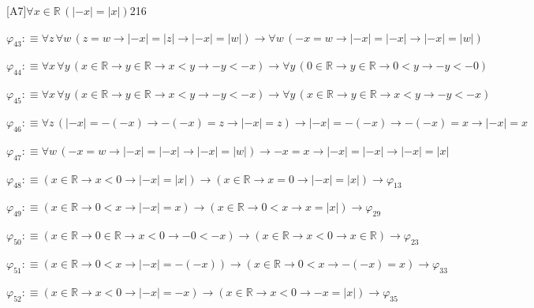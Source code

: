 \begin{fullproof}{[A7]}{$\forall x \in \mathbb{R}\,(\lvert -x \rvert = \lvert x \rvert)$}{216}
\begin{abbrevlist}
\item $\varphi_{43} :\equiv \forall z\,\forall w\,(z = w \to \lvert -x \rvert = \lvert z \rvert \to \lvert -x \rvert = \lvert w \rvert) \to \forall w\,(-x = w \to \lvert -x \rvert = \lvert -x \rvert \to \lvert -x \rvert = \lvert w \rvert)$
\item $\varphi_{44} :\equiv \forall x\,\forall y\,(x \in \mathbb{R} \to y \in \mathbb{R} \to x < y \to -y < -x) \to \forall y\,(0 \in \mathbb{R} \to y \in \mathbb{R} \to 0 < y \to -y < -0)$
\item $\varphi_{45} :\equiv \forall x\,\forall y\,(x \in \mathbb{R} \to y \in \mathbb{R} \to x < y \to -y < -x) \to \forall y\,(x \in \mathbb{R} \to y \in \mathbb{R} \to x < y \to -y < -x)$
\item $\varphi_{46} :\equiv \forall z\,(\lvert -x \rvert = -(-x) \to -(-x) = z \to \lvert -x \rvert = z) \to \lvert -x \rvert = -(-x) \to -(-x) = x \to \lvert -x \rvert = x$
\item $\varphi_{47} :\equiv \forall w\,(-x = w \to \lvert -x \rvert = \lvert -x \rvert \to \lvert -x \rvert = \lvert w \rvert) \to -x = x \to \lvert -x \rvert = \lvert -x \rvert \to \lvert -x \rvert = \lvert x \rvert$
\item $\varphi_{48} :\equiv (x \in \mathbb{R} \to x < 0 \to \lvert -x \rvert = \lvert x \rvert) \to (x \in \mathbb{R} \to x = 0 \to \lvert -x \rvert = \lvert x \rvert) \to \varphi_{13}$
\item $\varphi_{49} :\equiv (x \in \mathbb{R} \to 0 < x \to \lvert -x \rvert = x) \to (x \in \mathbb{R} \to 0 < x \to x = \lvert x \rvert) \to \varphi_{29}$
\item $\varphi_{50} :\equiv (x \in \mathbb{R} \to 0 \in \mathbb{R} \to x < 0 \to -0 < -x) \to (x \in \mathbb{R} \to x < 0 \to x \in \mathbb{R}) \to \varphi_{23}$
\item $\varphi_{51} :\equiv (x \in \mathbb{R} \to 0 < x \to \lvert -x \rvert = -(-x)) \to (x \in \mathbb{R} \to 0 < x \to -(-x) = x) \to \varphi_{33}$
\item $\varphi_{52} :\equiv (x \in \mathbb{R} \to x < 0 \to \lvert -x \rvert = -x) \to (x \in \mathbb{R} \to x < 0 \to -x = \lvert x \rvert) \to \varphi_{35}$
\end{abbrevlist}
\end{fullproof}

